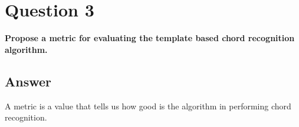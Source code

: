 \documentclass[
	12pt, %
]{fphw}
\begin{document}

\section*{\color{red}Question 3}

\begin{problem}
	\textbf{Propose a metric for evaluating the template based chord recognition algorithm.}
\end{problem}

\subsection*{\color{blue}Answer}

A metric is a value that tells us how good is the algorithm in performing chord recognition.
\end{document}
